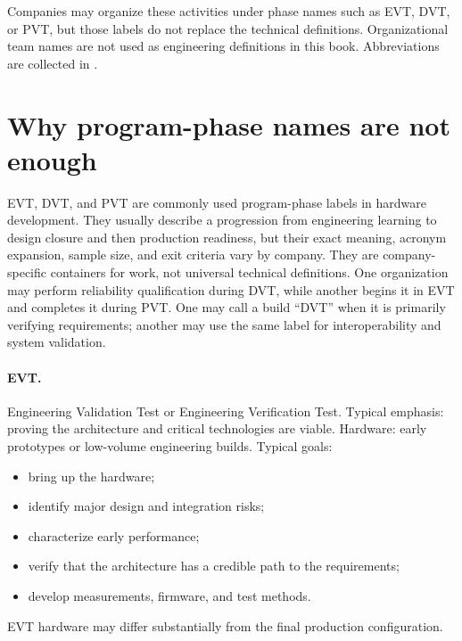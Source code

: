 Companies may organize these activities under phase names such as EVT, DVT, or
PVT, but those labels do not replace the technical definitions. Organizational
team names are not used as engineering definitions in this book. Abbreviations
are collected in .

\section{Why program-phase names are not enough}
\label{sec:phase-labels}

EVT,
DVT,
and PVT
are commonly used program-phase labels in hardware development. They usually
describe a progression from engineering learning to design closure and then
production readiness, but their exact meaning, acronym expansion, sample size,
and exit criteria vary by company. They are company-specific containers for
work, not universal technical definitions. One organization may perform
reliability qualification during DVT, while another begins it in EVT and
completes it during PVT. One may call a build ``DVT'' when it is primarily
verifying requirements; another may use the same label for interoperability
and system validation.

\paragraph{EVT.}
Engineering Validation Test or Engineering Verification Test.
Typical emphasis: proving the architecture and critical technologies are
viable.
Hardware: early prototypes or low-volume engineering builds.
Typical goals:
\begin{itemize}
\item bring up the hardware;
\item identify major design and integration risks;
\item characterize early performance;
\item verify that the architecture has a credible path to the requirements;
\item develop measurements, firmware, and test methods.
\end{itemize}
EVT hardware may differ substantially from the final production configuration.

